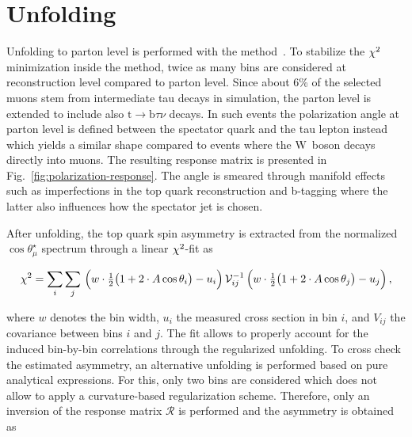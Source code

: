 

\section{Unfolding}
\label{sec:polarization-unfolding}


Unfolding to parton level is performed with the \TUNFOLD method~\cite{1748-0221-7-10-T10003}. To stabilize the $\chi^\scriptn{2}$ minimization inside the method, twice as many bins are considered at reconstruction level compared to parton level. Since about 6\% of the selected muons stem from intermediate tau decays in simulation, the parton level is extended to include also $\mathrm{t}\to\mathrm{b}\tau\nu$ decays. In such events the polarization angle at parton level is defined between the spectator quark and the tau lepton instead which yields a similar shape compared to events where the W~boson decays directly into muons. The resulting response matrix is presented in Fig.~\ref{fig:polarization-response}. The angle is smeared through manifold effects such as imperfections in the top quark reconstruction and b-tagging where the latter also influences how the spectator jet is chosen. 
 

After unfolding, the top quark spin asymmetry is extracted from the normalized $\cos\theta_\mu^\star$ spectrum through a linear $\chi^\scriptn{2}$-fit as

\begin{equation}
\chi^\scriptn{2}=\sum_{i}\sum_{j}\,\Big(w\cdot\tfrac{1}{2}\big(1+2\cdot A \cos\theta_{i}\big)-u_{i}\Big)\,\mathcal{V}_{ij}^{-1}\,\Big(w\cdot\tfrac{1}{2}\big(1+2\cdot A \cos\theta_{j}\big)-u_{j}\Big)\,,
\end{equation}

where $w$ denotes the bin width, $u_{i}$ the measured cross section in bin $i$, and $V_{ij}$ the covariance between bins $i$ and $j$. The fit allows to properly account for the induced bin-by-bin correlations through the regularized unfolding. To cross check the estimated asymmetry, an alternative unfolding is performed based on pure analytical expressions. For this, only two bins are considered which does not allow to apply a curvature-based regularization scheme. Therefore, only an inversion of the response matrix $\mathcal{R}$ is performed and the asymmetry is obtained as

